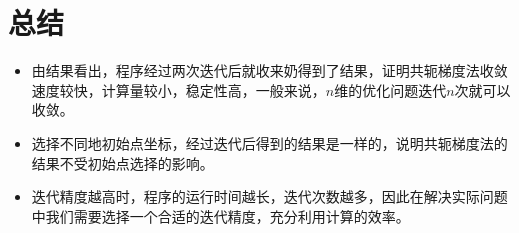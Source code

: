 \documentclass[10pt, a4paper,UTF8]{article}
\begin{document}
\section{总结}
\begin{itemize}
    \item 由结果看出，程序经过两次迭代后就收来奶得到了结果，证明共轭梯度法收敛速度较快，计算量较小，稳定性高，一般来说，$n$维的优化问题迭代$n$次就可以收敛。
    \item 选择不同地初始点坐标，经过迭代后得到的结果是一样的，说明共轭梯度法的结果不受初始点选择的影响。
    \item 迭代精度越高时，程序的运行时间越长，迭代次数越多，因此在解决实际问题中我们需要选择一个合适的迭代精度，充分利用计算的效率。
\end{itemize}
\end{document}
